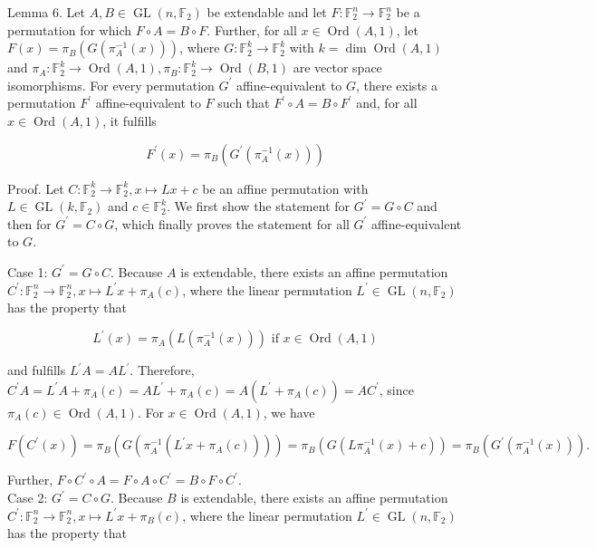 \documentclass[10pt]{article}
\begin{document}
Lemma 6. Let $A, B \in \operatorname{GL}\left(n, \mathbb{F}_{2}\right)$ be extendable and let $F: \mathbb{F}_{2}^{n} \rightarrow \mathbb{F}_{2}^{n}$ be a permutation for which $F \circ A=B \circ F$. Further, for all $x \in \operatorname{Ord}(A, 1)$, let $F(x)=\pi_{B}\left(G\left(\pi_{A}^{-1}(x)\right)\right)$, where $G: \mathbb{F}_{2}^{k} \rightarrow \mathbb{F}_{2}^{k}$ with $k=\operatorname{dim} \operatorname{Ord}(A, 1)$ and $\pi_{A}: \mathbb{F}_{2}^{k} \rightarrow \operatorname{Ord}(A, 1), \pi_{B}: \mathbb{F}_{2}^{k} \rightarrow \operatorname{Ord}(B, 1)$ are vector space isomorphisms. For every permutation $G^{\prime}$ affine-equivalent to $G$, there exists a permutation $F^{\prime}$ affine-equivalent to $F$ such that $F^{\prime} \circ A=B \circ F^{\prime}$ and, for all $x \in \operatorname{Ord}(A, 1)$, it fulfills

$$
F^{\prime}(x)=\pi_{B}\left(G^{\prime}\left(\pi_{A}^{-1}(x)\right)\right)
$$

Proof. Let $C: \mathbb{F}_{2}^{k} \rightarrow \mathbb{F}_{2}^{k}, x \mapsto L x+c$ be an affine permutation with $L \in \operatorname{GL}\left(k, \mathbb{F}_{2}\right)$ and $c \in \mathbb{F}_{2}^{k}$. We first show the statement for $G^{\prime}=G \circ C$ and then for $G^{\prime}=C \circ G$, which finally proves the statement for all $G^{\prime}$ affine-equivalent to $G$.

Case 1: $G^{\prime}=G \circ C$. Because $A$ is extendable, there exists an affine permutation $C^{\prime}: \mathbb{F}_{2}^{n} \rightarrow \mathbb{F}_{2}^{n}, x \mapsto L^{\prime} x+\pi_{A}(c)$, where the linear permutation $L^{\prime} \in \operatorname{GL}\left(n, \mathbb{F}_{2}\right)$ has the property that

$$
L^{\prime}(x)=\pi_{A}\left(L\left(\pi_{A}^{-1}(x)\right)\right) \text { if } x \in \operatorname{Ord}(A, 1)
$$

and fulfills $L^{\prime} A=A L^{\prime}$. Therefore, $C^{\prime} A=L^{\prime} A+\pi_{A}(c)=A L^{\prime}+\pi_{A}(c)=A\left(L^{\prime}+\pi_{A}(c)\right)= A C^{\prime}$, since $\pi_{A}(c) \in \operatorname{Ord}(A, 1)$. For $x \in \operatorname{Ord}(A, 1)$, we have

$$
F\left(C^{\prime}(x)\right)=\pi_{B}\left(G\left(\pi_{A}^{-1}\left(L^{\prime} x+\pi_{A}(c)\right)\right)\right)=\pi_{B}\left(G\left(L \pi_{A}^{-1}(x)+c\right)\right)=\pi_{B}\left(G^{\prime}\left(\pi_{A}^{-1}(x)\right)\right) .
$$

Further, $F \circ C^{\prime} \circ A=F \circ A \circ C^{\prime}=B \circ F \circ C^{\prime}$.\\
Case 2: $G^{\prime}=C \circ G$. Because $B$ is extendable, there exists an affine permutation $C^{\prime}: \mathbb{F}_{2}^{n} \rightarrow \mathbb{F}_{2}^{n}, x \mapsto L^{\prime} x+\pi_{B}(c)$, where the linear permutation $L^{\prime} \in \operatorname{GL}\left(n, \mathbb{F}_{2}\right)$ has the property that
\end{document}
